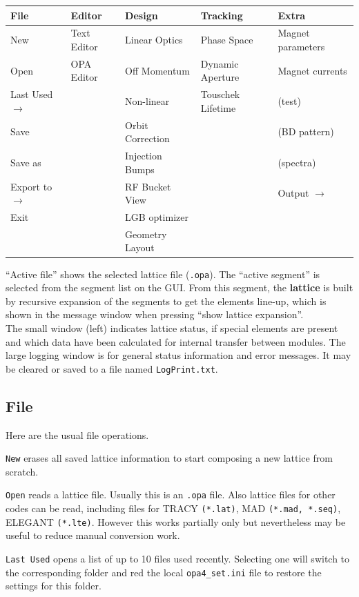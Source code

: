 \documentclass[12pt]{article}
\begin{document}
\begin{tabular}{||l|l|l|l|l||}
\hline
File & Editor & Design & Tracking & Extra \\
\hline
New & Text Editor & Linear Optics & Phase Space &  Magnet parameters \\
Open & OPA Editor & Off Momentum & Dynamic Aperture & Magnet currents \\
Last Used $\rightarrow$ & & Non-linear & Touschek Lifetime &  (test)\\
Save & & Orbit Correction & &  (BD pattern) \\
Save as & & Injection Bumps &  & (spectra) \\
Export to $\rightarrow$ & & RF Bucket View & & Output $\rightarrow$ \\
Exit & & LGB optimizer & & \\
 & & Geometry Layout & & \\
\hline
\end{tabular}\vspace{1ex}

``Active file'' shows the selected lattice file ({\tt *.opa}). 
The ``active segment'' is selected from the segment list on the GUI.
From this segment, the {\bf lattice} is built by recursive expansion
of the segments to get the elements line-up, which is shown in the message
window when pressing ``show lattice expansion''.\\

The small window (left) indicates lattice status, if special elements are present and which data have been calculated for internal transfer between modules. The large logging window is for general status information and error messages. It may be cleared or saved to a file named {\tt LogPrint.txt}.


\subsection{File}
Here are the usual file operations. 

{\tt New} erases all saved lattice information to start composing a new lattice from scratch.

{\tt Open} reads a lattice file. Usually this is an {\tt *.opa} file. Also lattice files for other codes can be read, including files for TRACY {\tt(*.lat)}, MAD {\tt (*.mad, *.seq)}, ELEGANT {\tt (*.lte)}. However this works partially only but nevertheless may be useful to reduce manual conversion work.

{\tt Last Used} opens a list of up to 10 files used recently. Selecting one will switch to the corresponding folder and red the local {\tt opa4\_set.ini} file to restore the settings for this folder.
\end{document}
